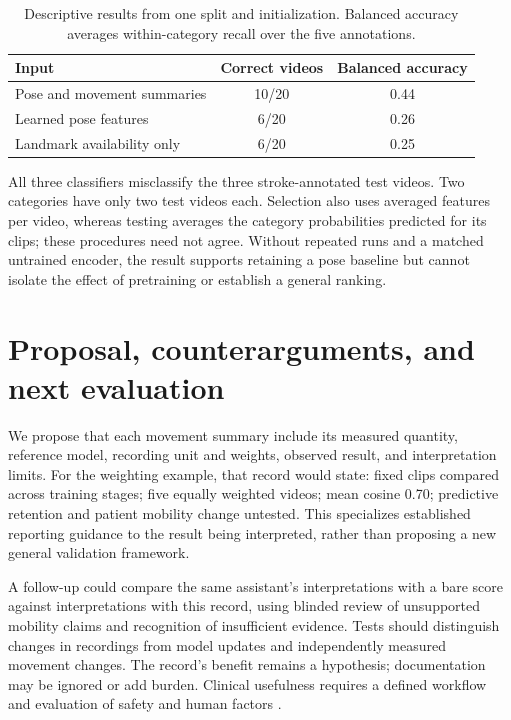\documentclass{article}
\begin{document}
\begin{table}[h]
\centering
\caption{Descriptive results from one split and initialization. Balanced accuracy averages within-category recall over the five annotations.}
\begin{tabular}{lcc}
\toprule
Input & Correct videos & Balanced accuracy\\
\midrule
Pose and movement summaries & 10/20 & 0.44\\
Learned pose features & 6/20 & 0.26\\
Landmark availability only & 6/20 & 0.25\\
\bottomrule
\end{tabular}
\end{table}

All three classifiers misclassify the three stroke-annotated test videos. Two categories have only two test videos each. Selection also uses averaged features per video, whereas testing averages the category probabilities predicted for its clips; these procedures need not agree. Without repeated runs and a matched untrained encoder, the result supports retaining a pose baseline but cannot isolate the effect of pretraining or establish a general ranking.

\section{Proposal, counterarguments, and next evaluation}

We propose that each movement summary include its measured quantity, reference model, recording unit and weights, observed result, and interpretation limits. For the weighting example, that record would state: fixed clips compared across training stages; five equally weighted videos; mean cosine 0.70; predictive retention and patient mobility change untested. This specializes established reporting guidance to the result being interpreted, rather than proposing a new general validation framework.

A follow-up could compare the same assistant's interpretations with a bare score against interpretations with this record, using blinded review of unsupported mobility claims and recognition of insufficient evidence. Tests should distinguish changes in recordings from model updates and independently measured movement changes. The record's benefit remains a hypothesis; documentation may be ignored or add burden. Clinical usefulness requires a defined workflow and evaluation of safety and human factors \citep{vasey2022decideai}.
\end{document}
